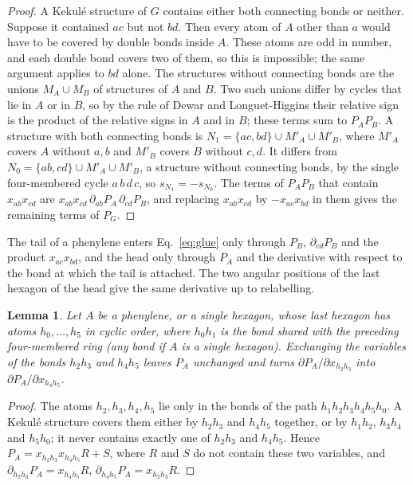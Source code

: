 \documentclass[11pt]{article}
\newtheorem{lemma}{Lemma}
\begin{document}
\begin{proof}
A Kekul\'e structure of $G$ contains either both connecting bonds or neither. Suppose it contained $ac$ but not $bd$. Then every atom of $A$ other than $a$ would have to be covered by double bonds inside $A$. These atoms are odd in number, and each double bond covers two of them, so this is impossible; the same argument applies to $bd$ alone. The structures without connecting bonds are the unions $M_A\cup M_B$ of structures of $A$ and $B$. Two such unions differ by cycles that lie in $A$ or in $B$, so by the rule of Dewar and Longuet-Higgins \citep{DewarLH1952} their relative sign is the product of the relative signs in $A$ and in $B$; these terms sum to $P_AP_B$. A structure with both connecting bonds is $N_1=\{ac,bd\}\cup M'_A\cup M'_B$, where $M'_A$ covers $A$ without $a,b$ and $M'_B$ covers $B$ without $c,d$. It differs from $N_0=\{ab,cd\}\cup M'_A\cup M'_B$, a structure without connecting bonds, by the single four-membered cycle $a\,b\,d\,c$, so $s_{N_1}=-s_{N_0}$. The terms of $P_AP_B$ that contain $x_{ab}x_{cd}$ are $x_{ab}x_{cd}\,\partial_{ab}P_A\,\partial_{cd}P_B$, and replacing $x_{ab}x_{cd}$ by $-x_{ac}x_{bd}$ in them gives the remaining terms of $P_G$.
\end{proof}

The tail of a phenylene enters Eq.~\eqref{eq:glue} only through $P_B$, $\partial_{cd}P_B$ and the product $x_{ac}x_{bd}$, and the head only through $P_A$ and the derivative with respect to the bond at which the tail is attached. The two angular positions of the last hexagon of the head give the same derivative up to relabelling.

\begin{lemma}
\label{lem:swap}
Let $A$ be a phenylene, or a single hexagon, whose last hexagon has atoms $h_0,\dots,h_5$ in cyclic order, where $h_0h_1$ is the bond shared with the preceding four-membered ring (any bond if $A$ is a single hexagon). Exchanging the variables of the bonds $h_2h_3$ and $h_4h_5$ leaves $P_A$ unchanged and turns $\partial P_A/\partial x_{h_2h_3}$ into $\partial P_A/\partial x_{h_4h_5}$.
\end{lemma}

\begin{proof}
The atoms $h_2,h_3,h_4,h_5$ lie only in the bonds of the path $h_1h_2h_3h_4h_5h_0$. A Kekul\'e structure covers them either by $h_2h_3$ and $h_4h_5$ together, or by $h_1h_2$, $h_3h_4$ and $h_5h_0$; it never contains exactly one of $h_2h_3$ and $h_4h_5$. Hence $P_A=x_{h_2h_3}x_{h_4h_5}R+S$, where $R$ and $S$ do not contain these two variables, and $\partial_{h_2h_3}P_A=x_{h_4h_5}R$, $\partial_{h_4h_5}P_A=x_{h_2h_3}R$.
\end{proof}
\end{document}
